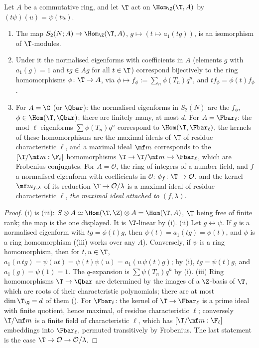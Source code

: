\begin{theorem}\label{thm:hecke:eigen-dictionary}
Let $A$ be a commutative ring, and let $\T$ act on $\Hom_\Z(\T,A)$ by $(t\psi)(u)=\psi(tu)$.
\begin{enumerate}[label=(\roman*)]
\item The map $S_2(N;A)\to\Hom_\Z(\T,A)$, $g\mapsto(t\mapsto a_1(tg))$, is an isomorphism of $\T$-modules.
\item Under it the normalised eigenforms with coefficients in $A$ (elements $g$ with $a_1(g)=1$ and $tg\in Ag$ for all $t\in\T$) correspond bijectively to the ring homomorphisms
$\phi\colon\T\to A$, via $\phi\mapsto f_\phi:=\sum_n\phi(T_n)q^n$, and $tf_\phi=\phi(t)f_\phi$.
\item For $A=\C$ (or $\Qbar$): the normalised eigenforms in $S_2(N)$ are the $f_\phi$, $\phi\in\Hom(\T,\Qbar)$; there are finitely many, at most $d$. For $A=\Fbar_\ell$: the mod $\ell$
eigenforms $\sum\phi(T_n)q^n$ correspond to $\Hom(\T,\Fbar_\ell)$, the kernels of these homomorphisms are the maximal ideals of $\T$ of residue characteristic $\ell$, and a maximal
ideal $\mf m$ corresponds to the $[\T/\mf m:\F_\ell]$ homomorphisms $\T\to\T/\mf m\hookrightarrow\Fbar_\ell$, which are Frobenius conjugates. For $A=\mathcal O$, the ring of integers of a number field,
and $f$ a normalised eigenform with coefficients in $\mathcal O$: $\phi_f\colon\T\to\mathcal O$, and the kernel $\mf m_{f,\lambda}$ of its reduction $\T\to\mathcal O/\lambda$ is a maximal ideal of
residue characteristic $\ell$, \emph{the maximal ideal attached to $(f,\lambda)$}.
\end{enumerate}
\end{theorem}

\begin{proof}
(i) is (iii): $S\otimes A\simeq\Hom(\T,\Z)\otimes A=\Hom(\T,A)$, $\T$ being free of finite rank; the map is the one displayed. It is $\T$-linear by
(i). (ii) Let $g\leftrightarrow\psi$. If $g$ is a normalised eigenform with $tg=\phi(t)g$, then $\psi(t)=a_1(tg)=\phi(t)$, and $\phi$ is a ring homomorphism
((iii) works over any $A$). Conversely, if $\psi$ is a ring homomorphism, then for $t,u\in\T$, $a_1(u\,tg)=\psi(ut)=\psi(t)\psi(u)=a_1(u\,\psi(t)g)$; by (i), $tg=\psi(t)g$, and
$a_1(g)=\psi(1)=1$. The $q$-expansion is $\sum\psi(T_n)q^n$ by (i). (iii) Ring homomorphisms $\T\to\Qbar$ are determined by the images of a $\Z$-basis of
$\T$, which are roots of their characteristic polynomials; there are at most $\dim\T_\Q=d$ of them (). For $\Fbar_\ell$: the kernel of $\T\to\Fbar_\ell$ is a prime
ideal with finite quotient, hence maximal, of residue characteristic $\ell$; conversely $\T/\mf m$ is a finite field of characteristic $\ell$, which has $[\T/\mf m:\F_\ell]$ embeddings
into $\Fbar_\ell$, permuted transitively by Frobenius. The last statement is the case $\T\to\mathcal O\to\mathcal O/\lambda$.
\end{proof}

